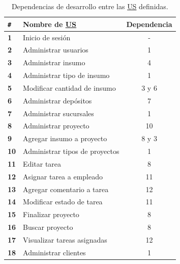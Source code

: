 \documentclass[a4paper, 12pt,twoside]{report}  %
\numberwithin{equation}{subsection} %
\begin{document}
\begin{table}[h!]
	\centering
	\begin{tabular}{ |p{0.5cm}|p{9cm}|c|  }
		\hline
		\verb|#|& \textbf{Nombre de \hyperlink{US}{US}}& \textbf{Dependencia} \\
		\hline
		\textbf{1} & \cellcolor{marca_US_realizada}Inicio de sesión & - \\
		\hline
		\textbf{2} & \cellcolor{marca_US_realizada}Administrar usuarios & 1 \\
		\hline
		\textbf{3} & Administrar insumo & 4 \\
		\hline
		\textbf{4} & Administrar tipo de insumo & 1 \\
		\hline
		\textbf{5} & Modificar cantidad de insumo & 3 y 6 \\
		\hline
		\textbf{6} & \cellcolor{marca_US_realizada}Administrar depósitos & 7 \\
		\hline
		\textbf{7} & \cellcolor{marca_US_realizada}Administrar sucursales & 1 \\
		\hline
		\textbf{8} & Administrar proyecto & 10 \\
		\hline
		\textbf{9} & Agregar insumo a proyecto & 8 y 3 \\
		\hline
		\textbf{10} & Administrar tipos de proyectos & 1 \\
		\hline
		\textbf{11} & Editar tarea & 8 \\
		\hline
		\textbf{12} & Asignar tarea a empleado & 11\\
		\hline
		\textbf{13} & Agregar comentario a tarea & 12 \\
		\hline
		\textbf{14} & Modificar estado de tarea & 11 \\
		\hline
		\textbf{15} & Finalizar proyecto & 8 \\
		\hline
		\textbf{16} & Buscar proyecto & 8 \\
		\hline
		\textbf{17} & Visualizar tareas asignadas & 12 \\
		\hline
		\textbf{18} & \cellcolor{marca_US_realizada}Administrar clientes & 1 \\
		\hline
	\end{tabular}
	\caption{Dependencias de desarrollo entre las \protect\hyperlink{US}{US} definidas.}
	\label{tabla_dependencias_us}
\end{table}
\end{document}
